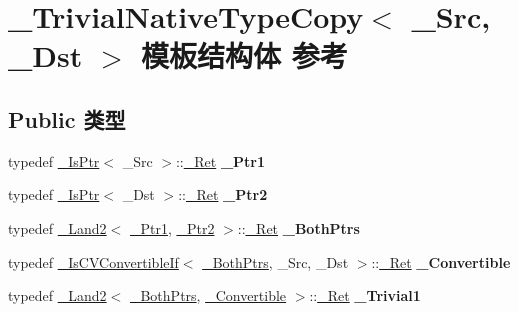 \hypertarget{struct___trivial_native_type_copy}{}\section{\+\_\+\+Trivial\+Native\+Type\+Copy$<$ \+\_\+\+Src, \+\_\+\+Dst $>$ 模板结构体 参考}
\label{struct___trivial_native_type_copy}
\subsection*{Public 类型}
\begin{DoxyCompactItemize}
\item 
\mbox{\label{struct___trivial_native_type_copy_a4dde57411ba5e6c032b66fab2b6a3bbc}} 
typedef \hyperlink{struct___is_ptr}{\+\_\+\+Is\+Ptr}$<$ \+\_\+\+Src $>$\+::\hyperlink{struct____true__type}{\+\_\+\+Ret} {\bfseries \+\_\+\+Ptr1}
\item 
\mbox{\label{struct___trivial_native_type_copy_abf78ed7b8fc5169a30124a9f412ba6b0}} 
typedef \hyperlink{struct___is_ptr}{\+\_\+\+Is\+Ptr}$<$ \+\_\+\+Dst $>$\+::\hyperlink{struct____true__type}{\+\_\+\+Ret} {\bfseries \+\_\+\+Ptr2}
\item 
\mbox{\label{struct___trivial_native_type_copy_aad83ef742337aac9a490ad78acb8968f}} 
typedef \hyperlink{struct___land2}{\+\_\+\+Land2}$<$ \hyperlink{struct____true__type}{\+\_\+\+Ptr1}, \hyperlink{struct____true__type}{\+\_\+\+Ptr2} $>$\+::\hyperlink{struct____true__type}{\+\_\+\+Ret} {\bfseries \+\_\+\+Both\+Ptrs}
\item 
\mbox{\label{struct___trivial_native_type_copy_a368064eed8a3dae0540be6a5a64f7a56}} 
typedef \hyperlink{struct___is_c_v_convertible_if}{\+\_\+\+Is\+C\+V\+Convertible\+If}$<$ \hyperlink{struct____false__type}{\+\_\+\+Both\+Ptrs}, \+\_\+\+Src, \+\_\+\+Dst $>$\+::\hyperlink{struct____true__type}{\+\_\+\+Ret} {\bfseries \+\_\+\+Convertible}
\item 
\mbox{\label{struct___trivial_native_type_copy_a586e93302395faf12a9940edb1fc5b68}} 
typedef \hyperlink{struct___land2}{\+\_\+\+Land2}$<$ \hyperlink{struct____false__type}{\+\_\+\+Both\+Ptrs}, \hyperlink{struct____false__type}{\+\_\+\+Convertible} $>$\+::\hyperlink{struct____true__type}{\+\_\+\+Ret} {\bfseries \+\_\+\+Trivial1}

\end{DoxyCompactItemize}
